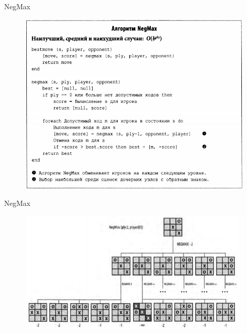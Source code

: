 \documentclass{beamer}
\begin{document}
\begin{frame}{NegMax}
\begin{figure}[h]
\centering
\includegraphics[scale=0.4]{images/lec05-pic06.png}
\end{figure}
\end{frame}

\begin{frame}{NegMax}
\begin{figure}[h]
\centering
\includegraphics[scale=0.6]{images/lec05-pic07.png}
\end{figure}
\end{frame}
\end{document}
